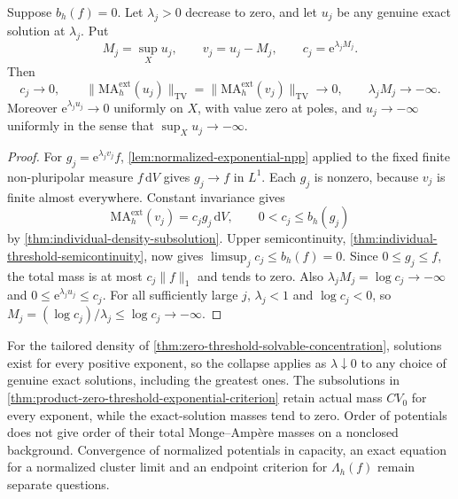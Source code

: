 \begin{proposition}\label{prop:zero-threshold-exponential-mass-collapse}
Suppose $b_h(f)=0$. Let $\lambda_j>0$ decrease to zero, and let $u_j$ be any genuine exact solution at $\lambda_j$. Put
\[
 M_j=\sup_Xu_j,\qquad v_j=u_j-M_j,\qquad
 c_j=\mathrm e^{\lambda_jM_j}.
\]
Then
\[
 c_j\longrightarrow0,\qquad
 \|\mathrm{MA}^{\mathrm{ext}}_h(u_j)\|_{\mathrm{TV}}
 =\|\mathrm{MA}^{\mathrm{ext}}_h(v_j)\|_{\mathrm{TV}}
 \longrightarrow0,\qquad \lambda_jM_j\longrightarrow-\infty.
\]
Moreover $\mathrm e^{\lambda_ju_j}\to0$ uniformly on $X$, with value zero at poles, and $u_j\to-\infty$ uniformly in the sense that $\sup_Xu_j\to-\infty$.
\end{proposition}
\begin{proof}
For $g_j=\mathrm e^{\lambda_jv_j}f$, \cref{lem:normalized-exponential-npp} applied to the fixed finite non-pluripolar measure $f\,\mathrm dV$ gives $g_j\to f$ in $L^1$. Each $g_j$ is nonzero, because $v_j$ is finite almost everywhere. Constant invariance gives
\[
 \mathrm{MA}^{\mathrm{ext}}_h(v_j)=c_jg_j\,\mathrm dV,
 \qquad 0<c_j\leq b_h(g_j)
\]
by \cref{thm:individual-density-subsolution}. Upper semicontinuity, \cref{thm:individual-threshold-semicontinuity}, now gives $\limsup_jc_j\leq b_h(f)=0$. Since $0\leq g_j\leq f$, the total mass is at most $c_j\|f\|_1$ and tends to zero. Also $\lambda_jM_j=\log c_j\to-\infty$ and $0\leq\mathrm e^{\lambda_ju_j}\leq c_j$. For all sufficiently large $j$, $\lambda_j<1$ and $\log c_j<0$, so $M_j=(\log c_j)/\lambda_j\leq\log c_j\to-\infty$.
\end{proof}

For the tailored density of \cref{thm:zero-threshold-solvable-concentration}, solutions exist for every positive exponent, so the collapse applies as $\lambda\downarrow0$ to any choice of genuine exact solutions, including the greatest ones. The subsolutions in \cref{thm:product-zero-threshold-exponential-criterion} retain actual mass $CV_0$ for every exponent, while the exact-solution masses tend to zero. Order of potentials does not give order of their total Monge--Amp\`ere masses on a nonclosed background. Convergence of normalized potentials in capacity, an exact equation for a normalized cluster limit and an endpoint criterion for $\Lambda_h(f)$ remain separate questions.
